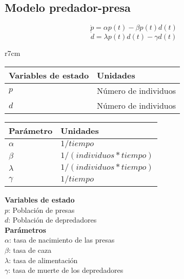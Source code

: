 \documentclass{article}
\begin{document}
    \subsection{Modelo predador-presa}
        \Large
        $$\dot{p} = \alpha p(t) - \beta p(t) d(t)$$
        $$\dot{d} = \lambda p(t) d(t) - \gamma d(t)$$
        \normalsize

        \begin{wraptable}[0]{r}{7cm}
            \begin{tabular}{|p{3.5cm} p{3.5cm}|}
                \hline
                Variables de estado & Unidades \\
                \hline
                $p$ & Número de individuos\\
                $d$ & Número de individuos\\
                \hline
            \end{tabular}
            \newline
            \vspace{0.5cm}
            \newline
            \begin{tabular}{|p{2cm} p{5cm}|}
                \hline
                Parámetro & Unidades \\
                \hline
                $\alpha$  & $1/tiempo$\\
                $\beta$   & $1/(individuos * tiempo)$\\
                $\lambda$ & $1/(individuos * tiempo)$\\
                $\gamma$  & $1/tiempo$\\
                \hline
            \end{tabular}
        \end{wraptable}

        \vspace{1cm}

        \large{\bf{Variables de estado}}\\

        \noindent
        $p$: Población de presas\\
        $d$: Población de depredadores\\

        \large{\bf{Parámetros}}\\

        \noindent
        $\alpha$:  tasa de nacimiento de las presas\\
        $\beta$:   tasa de caza\\
        $\lambda$: tasa de alimentación\\
        $\gamma$:  tasa de muerte de los depredadores
        \cite{predator}
\end{document}
